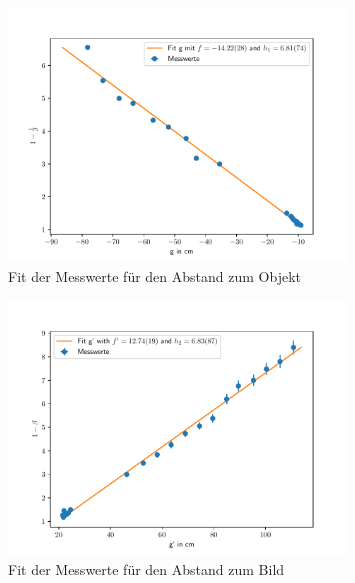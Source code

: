 \documentclass[11pt, a4paper]{article}
\begin{document}
    \begin{figure}[h]
        \centering
        \includegraphics[width=0.8\textwidth]{g.pdf}
        \caption{Fit der Messwerte für den Abstand zum Objekt}
        \label{fig:fit1}
    \end{figure}

    \begin{figure}[h]
        \centering
        \includegraphics[width=0.8\textwidth]{g_prime.pdf}
        \caption{Fit der Messwerte für den Abstand zum Bild}
        \label{fig:fit2}
    \end{figure}

\end{document}
